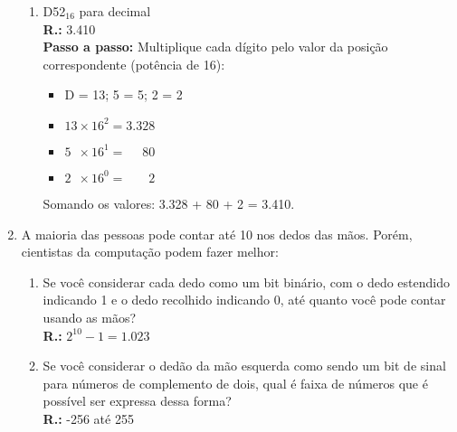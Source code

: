 \documentclass{article}[12pt]
\begin{document}
\begin{enumerate}
\begin{enumerate}
            \item D52$_{16}$ para decimal \\
            \textbf{R.:} 3.410 \\
            \textbf{Passo a passo:} Multiplique cada dígito pelo valor da posição correspondente (potência de 16):
            \begin{itemize}
                \item D = 13; 5 = 5; 2 = 2
                \item $13           \times 16^2 =           3.328$
                \item $5\phantom{0} \times 16^1 = \phantom{0.0}80$
                \item $2\phantom{0} \times 16^0 = \phantom{0.00}2$
            \end{itemize}
            Somando os valores: 3.328 + 80 + 2 = 3.410.
        \end{enumerate}
    
    \item A maioria das pessoas pode contar até 10 nos dedos das mãos. Porém, cientistas da computação podem fazer melhor:
    \begin{enumerate}
        \item Se você considerar cada dedo como um bit binário, com o dedo estendido indicando 1 e o dedo recolhido indicando 0, até quanto você pode contar usando as mãos? \\
        \textbf{R.:} $2^{10}-1 = 1.023$
        
        \item Se você considerar o dedão da mão esquerda como sendo um bit de sinal para números de complemento de dois, qual é faixa de números que é possível ser expressa dessa forma? \\
        \textbf{R.:} -256 até 255
    \end{enumerate}
\end{enumerate}
\end{document}
